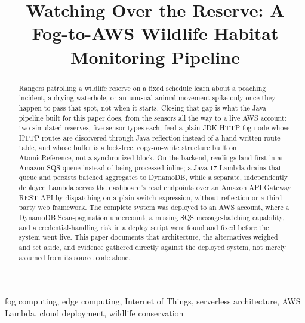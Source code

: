 \documentclass[conference,a4paper]{IEEEtran}
\begin{document}
\title{Watching Over the Reserve: A Fog-to-AWS Wildlife Habitat Monitoring Pipeline}

\author{
}

\maketitle

\begin{abstract}
Rangers patrolling a wildlife reserve on a fixed schedule learn about a poaching incident, a drying waterhole, or an unusual animal-movement spike only once they happen to pass that spot, not when it starts. Closing that gap is what the Java pipeline built for this paper does, from the sensors all the way to a live AWS account: two simulated reserves, five sensor types each, feed a plain-JDK HTTP fog node whose HTTP routes are discovered through Java reflection instead of a hand-written route table, and whose buffer is a lock-free, copy-on-write structure built on AtomicReference, not a synchronized block. On the backend, readings land first in an Amazon SQS queue instead of being processed inline; a Java 17 Lambda drains that queue and persists batched aggregates to DynamoDB, while a separate, independently deployed Lambda serves the dashboard's read endpoints over an Amazon API Gateway REST API by dispatching on a plain switch expression, without reflection or a third-party web framework. The complete system was deployed to an AWS account, where a DynamoDB Scan-pagination undercount, a missing SQS message-batching capability, and a credential-handling risk in a deploy script were found and fixed before the system went live. This paper documents that architecture, the alternatives weighed and set aside, and evidence gathered directly against the deployed system, not merely assumed from its source code alone.
\end{abstract}

\begin{IEEEkeywords}
fog computing, edge computing, Internet of Things, serverless architecture, AWS Lambda, cloud deployment, wildlife conservation
\end{IEEEkeywords}
\end{document}
